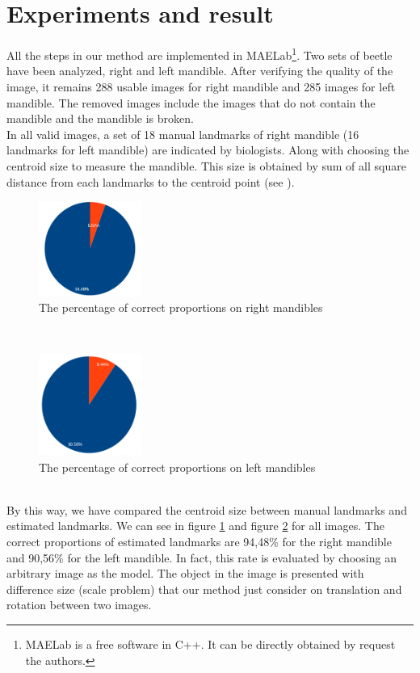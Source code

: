\documentclass[twoside,twocolumn,10pt]{article}
\begin{document}
\section{Experiments and result}
All the steps in our method are implemented in MAELab\footnote{MAELab is a free software in C++. It can be directly obtained by request the authors.}. Two sets of beetle have been analyzed, right and left mandible. After verifying the quality of the image, it remains 288 usable images for right mandible and 285 images for left mandible. The removed images include the images that do not contain the mandible and the mandible is broken.\\
In all valid images, a set of 18 manual landmarks of right mandible (16 landmarks for left mandible) are indicated by biologists. Along with choosing the centroid size to measure the mandible. This size is obtained by sum of all square distance from each landmarks to the centroid point (see \cite{Webster}).
\begin{figure}[htb]
    \centering
    \includegraphics[width=0.3\textwidth]{./images/mdresult}
    \caption{The percentage of correct proportions on right mandibles }
    \label{figmdresult}
\end{figure}~\\
\begin{figure}[htb]
    \centering
    \includegraphics[width=0.3\textwidth]{./images/mgresult}
    \caption{The percentage of correct proportions on left mandibles }
    \label{figmgresult}
\end{figure}~\\
By this way, we have compared the centroid size between manual landmarks and estimated landmarks. We can see in figure \ref{figmdresult} and figure \ref{figmgresult} for all images. The correct proportions of estimated landmarks are 94,48\% for the right mandible and 90,56\% for the left mandible. In fact, this rate is evaluated by choosing an arbitrary image as the model. The object in the image is presented with difference size (scale problem) that our method just consider on translation and rotation between two images. \\
\end{document}
